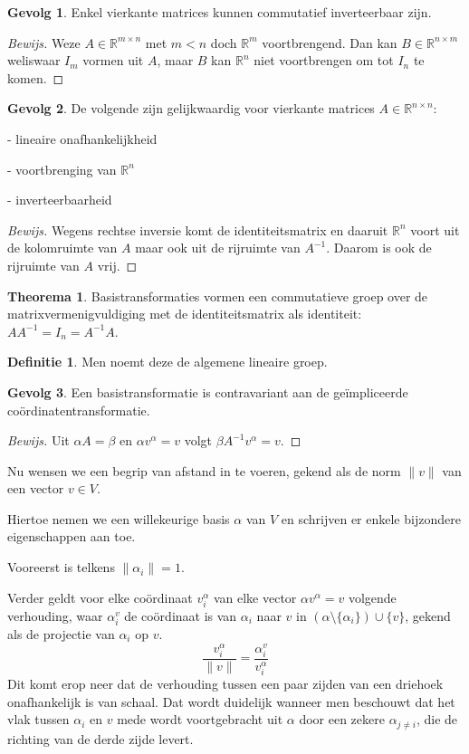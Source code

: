 \documentclass{amsart}
\theoremstyle{definition}
\newtheorem{thm}{Theorema}[section]
\newtheorem{dfn}{Definitie}[section]
\newtheorem{csq}{Gevolg}[section]
\newcommand{\realnums}{\mathbb{R}}
\newcommand{\realn}[1][n]{\realnums^{#1}}
\newcommand{\realmx}[2][n]{\realn[#2 \times #1]}
\newcommand{\realnxn}{\realmx{n}}
\newcommand{\realmxn}{\realmx{m}}
\newcommand{\norm}[1]{\lVert#1\rVert}
\newcommand{\without}[1]{\setminus\{#1\}}
\newcommand{\with}[1]{\cup\{#1\}}
\newenvironment{bewijs}{\begin{proof}[Bewijs]}{\end{proof}}
\begin{document}
\begin{csq}
	Enkel vierkante matrices kunnen commutatief inverteerbaar zijn.
	\begin{bewijs}
		Weze $A \in \realmxn$ met $m < n$ doch $\realn[m]$ voortbrengend.
		Dan kan $B \in \realmx[m]{n}$ weliswaar $I_m$ vormen uit $A$, maar $B$ kan $\realn$ niet voortbrengen om tot $I_n$ te komen.
	\end{bewijs}
\end{csq}

\begin{csq}
	De volgende zijn gelijkwaardig voor vierkante matrices $A \in \realnxn$:

	- lineaire onafhankelijkheid

	- voortbrenging van $\realn$

	- inverteerbaarheid
	\begin{bewijs}
		Wegens rechtse inversie komt de identiteitsmatrix en daaruit $\realn$ voort uit de kolomruimte van $A$ maar ook uit de rijruimte van $A^{-1}$. Daarom is ook de rijruimte van $A$ vrij.
	\end{bewijs}
\end{csq}

\begin{thm}
	Basistransformaties vormen een commutatieve groep over de matrixvermenigvuldiging met de identiteitsmatrix als identiteit: $AA^{-1} = I_n = A^{-1}A$.
\end{thm}

\begin{dfn}
	Men noemt deze de algemene lineaire groep.
\end{dfn}

\begin{csq}
	Een basistransformatie is contravariant aan de ge\"{i}mpliceerde co\"{o}rdinatentransformatie. 
	\begin{bewijs}
		Uit $\alpha A = \beta$ en $\alpha v^\alpha = v$ volgt $\beta A^{-1} v^\alpha = v$.
	\end{bewijs}
\end{csq}

Nu wensen we een begrip van afstand in te voeren, gekend als de norm $\norm{v}$ van een vector $v \in V$.

Hiertoe nemen we een willekeurige basis $\alpha$ van $V$ en schrijven er enkele bijzondere eigenschappen aan toe.

Vooreerst is telkens $\norm{\alpha_i} = 1$.

Verder geldt voor elke coördinaat $v^\alpha_i$ van elke vector $\alpha v^\alpha = v$ volgende verhouding, waar $\alpha_i^v$ de coördinaat is van $\alpha_i$ naar $v$ in $(\alpha \without{\alpha_i})\with{v}$, gekend als de projectie van $\alpha_i$ op $v$.
\begin{equation*}
	\frac{v^\alpha_i}{\norm{v}} = \frac{\alpha_i^v}{v^\alpha_i}
\end{equation*}
Dit komt erop neer dat de verhouding tussen een paar zijden van een driehoek onafhankelijk is van schaal. Dat wordt duidelijk wanneer men beschouwt dat het vlak tussen $\alpha_i$ en $v$ mede wordt voortgebracht uit $\alpha$ door een zekere $\alpha_{j\neq i}$, die de richting van de derde zijde levert.
\end{document}
